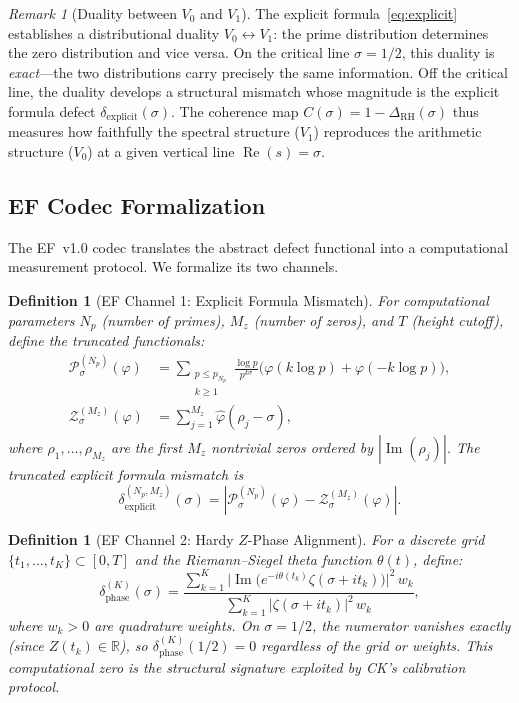\documentclass[11pt]{article}
\newtheorem{definition}[theorem]{Definition}
\theoremstyle{remark}
\newtheorem{remark}[theorem]{Remark}
\DeclareMathOperator{\Ima}{Im}
\DeclareMathOperator{\Rea}{Re}
\begin{document}
\begin{remark}[Duality between $V_0$ and $V_1$]
The explicit formula~\eqref{eq:explicit} establishes a distributional duality
$V_0\leftrightarrow V_1$: the prime distribution determines the zero distribution
and vice versa.
On the critical line $\sigma=1/2$, this duality is \emph{exact}---the two
distributions carry precisely the same information.
Off the critical line, the duality develops a structural mismatch whose magnitude
is the explicit formula defect $\delta_{\mathrm{explicit}}(\sigma)$.
The coherence map $C(\sigma)=1-\Delta_{\mathrm{RH}}(\sigma)$ thus measures
how faithfully the spectral structure ($V_1$) reproduces the arithmetic
structure ($V_0$) at a given vertical line $\Rea(s)=\sigma$.
\end{remark}

\subsection{EF Codec Formalization}
\label{subsec:ef-formal}

The EF~v1.0 codec translates the abstract defect functional into a
computational measurement protocol.
We formalize its two channels.

\begin{definition}[EF Channel 1: Explicit Formula Mismatch]
\label{def:ef-mismatch}
For computational parameters $N_p$ (number of primes), $M_z$ (number of zeros),
and $T$ (height cutoff), define the truncated functionals:
\begin{align}
  \mathcal{P}_\sigma^{(N_p)}(\varphi)
  &= \sum_{\substack{p\leq p_{N_p}\\k\geq 1}}
    \frac{\log p}{p^{k\sigma}}\bigl(\varphi(k\log p)+\varphi(-k\log p)\bigr),
    \label{eq:ef-P}\\
  \mathcal{Z}_\sigma^{(M_z)}(\varphi)
  &= \sum_{j=1}^{M_z}\hat{\varphi}(\rho_j - \sigma),
    \label{eq:ef-Z}
\end{align}
where $\rho_1,\ldots,\rho_{M_z}$ are the first $M_z$ nontrivial zeros ordered by
$|\Ima(\rho_j)|$.
The truncated explicit formula mismatch is
\[
  \delta_{\mathrm{explicit}}^{(N_p,M_z)}(\sigma)
  = \left|\mathcal{P}_\sigma^{(N_p)}(\varphi) - \mathcal{Z}_\sigma^{(M_z)}(\varphi)\right|.
\]
\end{definition}

\begin{definition}[EF Channel 2: Hardy $Z$-Phase Alignment]
\label{def:ef-phase}
For a discrete grid $\{t_1,\ldots,t_K\}\subset[0,T]$ and the Riemann--Siegel
theta function $\theta(t)$, define:
\[
  \delta_{\mathrm{phase}}^{(K)}(\sigma)
  = \frac{\displaystyle\sum_{k=1}^K
    \bigl|\Ima\bigl(e^{-i\theta(t_k)}\zeta(\sigma+it_k)\bigr)\bigr|^2\,w_k}
  {\displaystyle\sum_{k=1}^K |\zeta(\sigma+it_k)|^2\,w_k},
\]
where $w_k>0$ are quadrature weights.
On $\sigma=1/2$, the numerator vanishes exactly (since $Z(t_k)\in\mathbb{R}$),
so $\delta_{\mathrm{phase}}^{(K)}(1/2)=0$ regardless of the grid or weights.
This computational zero is the structural signature exploited by CK's
calibration protocol.
\end{definition}
\end{document}

